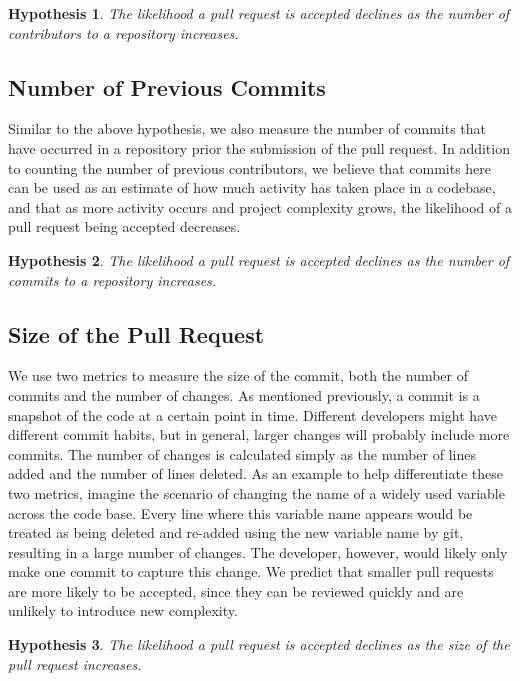 \documentclass[12pt]{article}
\newtheorem{hyp}{Hypothesis}
\begin{document}
\begin{hyp}
The likelihood a pull request is accepted declines as the number of contributors
to a repository increases.
\end{hyp}

\subsection{Number of Previous Commits}
Similar to the above hypothesis, we also measure the number of commits that have
occurred in a repository prior the submission of the pull request. In addition
to counting the number of previous contributors, we believe that commits here
can be used as an estimate of how much activity has taken place in a codebase,
and that as more activity occurs and project complexity grows, the likelihood of
a pull request being accepted decreases.

\begin{hyp}
The likelihood a pull request is accepted declines as the number of commits to a
repository increases.
\end{hyp}

\subsection{Size of the Pull Request}
We use two metrics to measure the size of the commit, both the number of commits
and the number of changes. As mentioned previously, a commit is a snapshot of
the code at a certain point in time. Different developers might have different
commit habits, but in general, larger changes will probably include more
commits. The number of changes is calculated simply as the number of lines added
and the number of lines deleted. As an example to help differentiate these two
metrics, imagine the scenario of changing the name of a widely used variable
across the code base. Every line where this variable name appears would be
treated as being deleted and re-added using the new variable name by git,
resulting in a large number of changes. The developer, however, would likely
only make one commit to capture this change. We predict that smaller pull
requests are more likely to be accepted, since they can be reviewed quickly and
are unlikely to introduce new complexity.

\begin{hyp}
The likelihood a pull request is accepted declines as the size of the pull
request increases.
\end{hyp}
\end{document}
